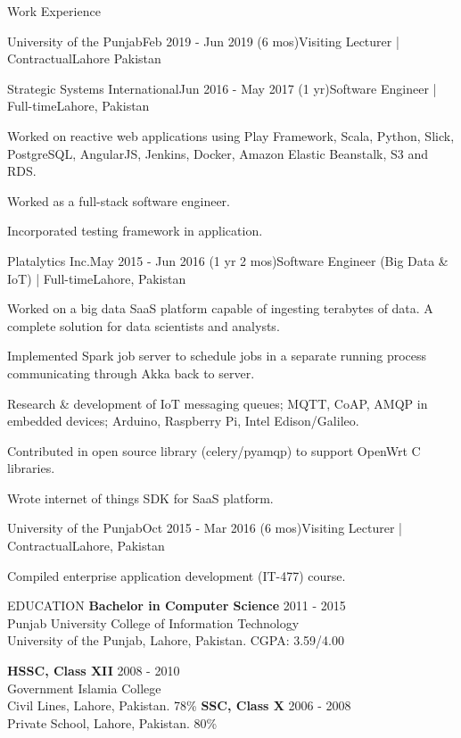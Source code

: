 \documentclass{resume}
\begin{document}
\begin{rSection}{Work Experience}
\begin{rSubsection}{University of the Punjab}{Feb 2019 - Jun 2019 (6 mos)}{Visiting Lecturer | Contractual}{Lahore Pakistan}
  \end{rSubsection}
  \begin{rSubsection}{Strategic Systems International}{Jun 2016 - May 2017 (1 yr)}{Software Engineer | Full-time}{Lahore, Pakistan}
    \item Worked on reactive web applications using Play Framework, Scala, Python, Slick, PostgreSQL, AngularJS, Jenkins, Docker, Amazon Elastic Beanstalk, S3 and RDS.
    \item Worked as a full-stack software engineer.
    \item Incorporated testing framework in application.
  \end{rSubsection}
  \begin{rSubsection}{Platalytics Inc.}{May 2015 - Jun 2016 (1 yr 2 mos)}{Software Engineer (Big Data \& IoT) | Full-time}{Lahore, Pakistan}
    \item Worked on a big data SaaS platform capable of ingesting terabytes of data. A complete solution for data scientists and analysts.
    \item Implemented Spark job server to schedule jobs in a separate running process communicating through Akka back to server.
    \item Research \& development of IoT messaging queues; MQTT, CoAP, AMQP in embedded devices; Arduino, Raspberry Pi, Intel Edison/Galileo.
    \item Contributed in open source library (celery/pyamqp) to support OpenWrt C libraries.
    \item Wrote internet of things SDK for SaaS platform.
  \end{rSubsection}
  \begin{rSubsection}{University of the Punjab}{Oct 2015 - Mar 2016 (6 mos)}{Visiting Lecturer | Contractual}{Lahore, Pakistan}
    \item Compiled enterprise application development (IT-477) course.
  \end{rSubsection}
\end{rSection}
\begin{rSection}{EDUCATION}
  {\bf Bachelor in Computer Science} \hfill {2011 - 2015}
  \\
  Punjab University College of Information Technology
  \\
  University of the Punjab, Lahore, Pakistan. CGPA: 3.59/4.00

  {\bf HSSC, Class XII} \hfill {2008 - 2010}
  \\
  Government Islamia College
  \\
  Civil Lines, Lahore, Pakistan. 78\%
    {\bf SSC, Class X}  \hfill {2006 - 2008}
  \\
  Private School, Lahore, Pakistan. 80\%

\end{rSection}
\end{document}
